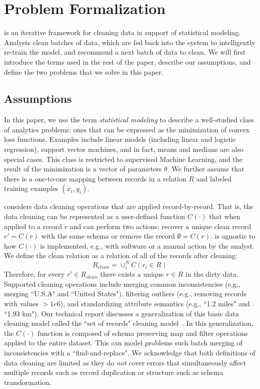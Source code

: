 \section{Problem Formalization}\label{statements}
\sys is an iterative framework for cleaning data in support of statistical modeling.
Analysts clean batches of data, which are fed back into the system to intelligently re-train the model, and recommend a next batch of data to clean.
We will first introduce the terms used in the rest of the paper, describe our assumptions, and define the two problems that we solve in this paper.

\subsection{Assumptions}\label{dmodel}
In this paper, we use the term \emph{statistical modeling} to describe a well-studied class of analytics problems; ones that can be expressed as the minimization of convex loss functions.
Examples include linear models (including linear and logistic regression), support vector machines, and in fact, means and medians are also special cases. 
This class is restricted to supervised Machine Learning, and the result of the minimization is a vector of parameters $\theta$.
We further assume that there is a one-to-one mapping between records in a relation $R$ and labeled training examples $(x_{i},y_{i})$.

\sys considers data cleaning operations that are applied record-by-record.
That is, the data cleaning can be represented as a user-defined function $C(\cdot)$ that when applied to a record $r$ and can perform two actions: recover a unique clean record $r' = C(r)$ with the same schema or remove the record $\emptyset = C(r)$.
\sys is agnostic to how $C(\cdot)$ is implemented, e.g., with software or a manual action by the analyst.
We define the clean relation as a relation of all of the records after cleaning:
\[R_{clean} = \cup_i^N C(r_i \in R)\]
Therefore, for every $r' \in R_{clean}$ there exists a unique $r \in R$ in the dirty data.
Supported cleaning operations include merging common inconsistencies (e.g., merging ``U.S.A" and ``United States"), filtering outliers (e.g., removing records with values $>1e6$), and standardizing attribute semantics (e.g., ``1.2 miles" and ``1.93 km").
Our technical report discusses a generalization of this basic data cleaning model called the ``set of records" cleaning model~\cite{activecleanarxiv}.
In this generalization, the $C(\cdot)$ function is composed of schema preserving \textsf{map} and \textsf{filter} operations applied to the entire dataset.
This can model problems such batch merging of inconsistencies with a ``find-and-replace".
We acknowledge that both definitions of data cleaning are limited as they do \emph{not} cover errors that simultaneously affect multiple records such as record duplication or structure such as schema transformation.


